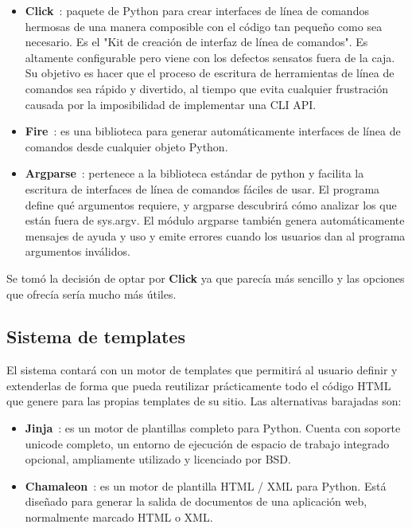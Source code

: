 \begin{itemize}
    \item \textbf{Click}~\cite{click}: paquete de Python para crear interfaces de línea de comandos hermosas de
una manera composible con el código tan pequeño como sea necesario. Es el "Kit de creación de interfaz de
línea de comandos". Es altamente configurable pero viene con los defectos sensatos fuera de la caja. Su objetivo es
hacer que el proceso de escritura de herramientas de línea de comandos sea rápido y divertido, al tiempo
que evita cualquier frustración causada por la imposibilidad de implementar una CLI API.
\item \textbf{Fire}~\cite{fire}: es una biblioteca para generar automáticamente interfaces de línea de comandos
desde cualquier objeto Python.
\item \textbf{Argparse}~\cite{argparse}: pertenece a la biblioteca estándar de python y facilita la escritura de interfaces
de línea de comandos fáciles de usar. El programa define qué argumentos requiere, y argparse descubrirá cómo
analizar los que están fuera de sys.argv. El módulo argparse también genera automáticamente mensajes de ayuda
y uso y emite errores cuando los usuarios dan al programa argumentos inválidos.
\end{itemize}

Se tomó la decisión de optar por \textbf{Click} ya que parecía más sencillo y las opciones que ofrecía sería mucho
más útiles.

\subsection{Sistema de templates}

El sistema contará con un motor de templates que permitirá al usuario definir y extenderlas de forma que pueda reutilizar
prácticamente todo el código HTML que genere para las propias templates de su sitio. Las alternativas barajadas son:


\begin{itemize}
\item \textbf{Jinja}~\cite{jinja}: es un motor de plantillas completo para Python. Cuenta con soporte unicode completo,
un entorno de ejecución de espacio de trabajo integrado opcional, ampliamente utilizado y licenciado por BSD.
\item \textbf{Chamaleon}~\cite{chamaleo}: es un motor de plantilla HTML / XML para Python. Está diseñado para generar
la salida de documentos de una aplicación web, normalmente marcado HTML o XML.
\end{itemize}

